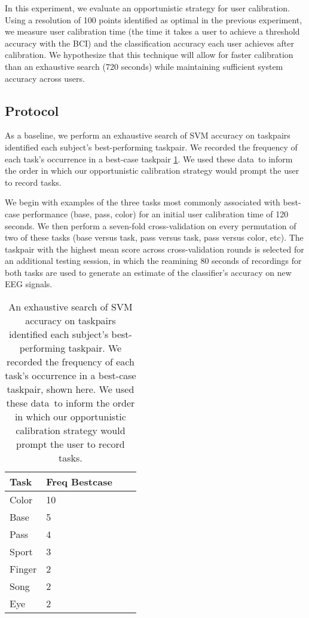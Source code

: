 In this experiment, we evaluate an opportunistic strategy for user calibration. Using a resolution of 100 points identified as optimal in the previous experiment, we measure user calibration time (the time it takes a user to achieve a threshold accuracy with the BCI) and the classification accuracy each user achieves after calibration. We hypothesize that this technique will allow for faster calibration than an exhaustive search (720 seconds) while maintaining sufficient system accuracy across users.

\subsection{Protocol}

As a baseline, we perform an exhaustive search of SVM accuracy on taskpairs identified each subject's best-performing taskpair. We recorded the frequency of each task's occurrence in a best-case taskpair \ref{table:name}. We used these data to inform the order in which our opportunistic calibration strategy would prompt the user to record tasks.

We begin with examples of the three tasks most commonly associated with best-case performance (base, pass, color) for an initial user calibration time of 120 seconds. We then perform a seven-fold cross-validation on every permutation of two of these tasks (base versus task, pass versus task, pass versus color, etc). The taskpair with the highest mean score across cross-validation rounds is selected for an additional testing session, in which the reamining 80 seconds of recordings for both tasks are used to generate an estimate of the classifier's accuracy on new EEG signals.


\begin{table}[!h]
  \vspace{-0.2cm}
  \centering
  \begin{tabular}{ | l | l | l | p{5cm} |}
  \hline
  Task & Freq Bestcase \\ \hline
  Color & 10 \\ \hline
  Base & 5 \\ \hline
  Pass & 4 \\ \hline
  Sport & 3 \\ \hline
  Finger & 2 \\ \hline
  Song & 2 \\ \hline
  Eye & 2 \\ \hline
  \end{tabular}
  \caption{An exhaustive search of SVM accuracy on taskpairs identified each subject's best-performing taskpair. We recorded the frequency of each task's occurrence in a best-case taskpair, shown here. We used these data to inform the order in which our opportunistic calibration strategy would prompt the user to record tasks.}
  \label{table:name}
  \vspace{-0.1cm}
\end{table}

